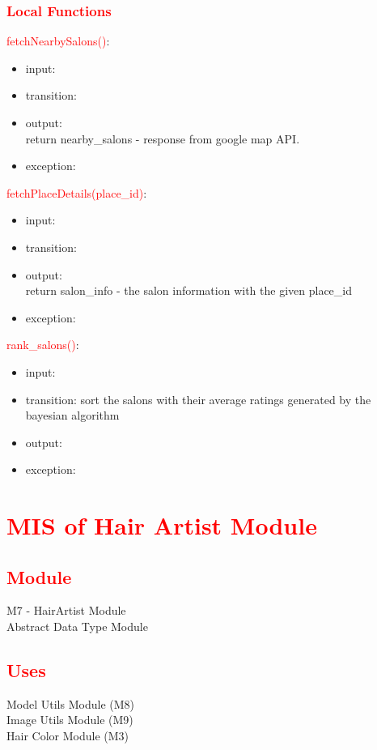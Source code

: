 \documentclass[12pt, titlepage]{article}
\begin{document}
\subsubsection{\textcolor{red}{Local Functions}}
\noindent \textcolor{red}{fetchNearbySalons()}:
\begin{itemize}
\item input: 
\item transition: 
\item output: \\
return nearby\_salons - response from google map API. 
\item exception: 
\end{itemize}

\noindent \textcolor{red}{fetchPlaceDetails(place\_id)}:
\begin{itemize}
\item input: 
\item transition: 
\item output: \\
return salon\_info - the salon information with the given place\_id 
\item exception: 
\end{itemize}

\noindent \textcolor{red}{rank\_salons()}:
\begin{itemize}
\item input: 
\item transition: 
sort the salons with their average ratings generated by the bayesian algorithm
\item output: \\
\item exception: 
\end{itemize}


\newpage
\section{\textcolor{red}{MIS of Hair Artist Module}}
\subsection{\textcolor{red}{Module}}
M7 - HairArtist Module\\
Abstract Data Type Module

\subsection{\textcolor{red}{Uses}}
Model Utils Module (M8) \\
Image Utils Module (M9) \\ 
Hair Color Module (M3) 
\end{document}
